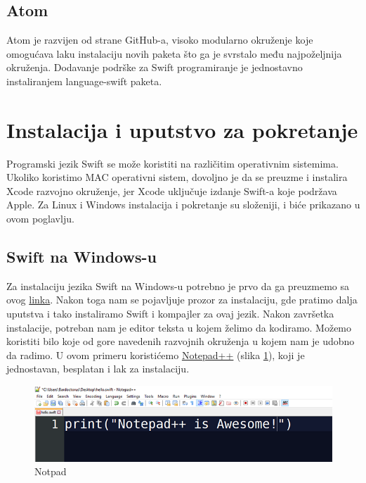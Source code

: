 \documentclass[a4paper]{article}
\begin{document}
\subsection{Atom}
\label{subsec:podnaslovAtom}
Atom je razvijen od strane GitHub-a, visoko modularno okruženje koje omogućava laku instalaciju novih paketa što ga je svrstalo među najpoželjnija okruženja. Dodavanje podrške za Swift programiranje je jednostavno instaliranjem language-swift paketa.



\section{Instalacija i uputstvo za pokretanje}	
\label{sec:petiDeo}

Programski jezik Swift se može koristiti na različitim operativnim sistemima. Ukoliko koristimo MAC operativni sistem, dovoljno je da se preuzme i instalira Xcode razvojno okruženje, jer Xcode uključuje izdanje Swift-a koje podržava Apple. Za Linux i Windows instalacija i pokretanje su složeniji, i biće prikazano u ovom poglavlju.

\subsection{Swift na Windows-u}
\label{subsec:podnaslovWindows}

Za instalaciju jezika Swift na Windows-u potrebno je prvo da ga preuzmemo sa ovog \href{https://swiftforwindows.github.io}{linka}. Nakon toga nam se pojavljuje prozor za instalaciju, gde pratimo dalja uputstva i tako instaliramo Swift i kompajler za ovaj jezik. Nakon završetka instalacije, potreban nam je editor teksta u kojem želimo da kodiramo. Možemo koristiti bilo koje od gore navedenih razvojnih okruženja u kojem nam je udobno da radimo. U ovom primeru koristićemo \href{https://notepad-plus-plus.org/download/v7.6.4.html}{Notepad++} (slika \ref{fig:notpad}), koji je jednostavan, besplatan i lak za instalaciju.

\begin{figure}[h!]
\begin{center}
\includegraphics[scale=0.35]{notepadpp.png}
\end{center}
\caption{Notpad}
\label{fig:notpad}
\end{figure}
\end{document}

